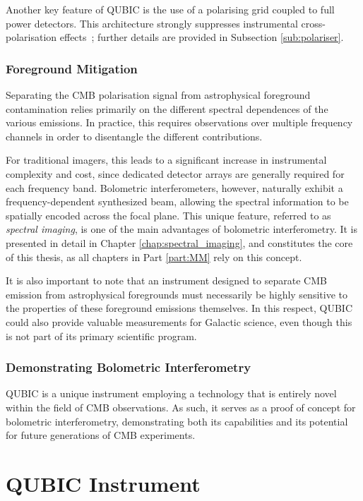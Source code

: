 \documentclass[../../thesis.tex]{subfiles}
\begin{document}
Another key feature of QUBIC is the use of a polarising grid coupled to full power detectors. This architecture strongly suppresses instrumental cross-polarisation effects~\cite{QUBICVI}; further details are provided in Subsection \ref{sub:polariser}.

\subsubsection{Foreground Mitigation}

Separating the CMB polarisation signal from astrophysical foreground contamination relies primarily on the different spectral dependences of the various emissions. In practice, this requires observations over multiple frequency channels in order to disentangle the different contributions.

For traditional imagers, this leads to a significant increase in instrumental complexity and cost, since dedicated detector arrays are generally required for each frequency band. Bolometric interferometers, however, naturally exhibit a frequency-dependent synthesized beam, allowing the spectral information to be spatially encoded across the focal plane. This unique feature, referred to as \emph{spectral imaging}, is one of the main advantages of bolometric interferometry. It is presented in detail in Chapter \ref{chap:spectral_imaging}, and constitutes the core of this thesis, as all chapters in Part \ref{part:MM} rely on this concept.

It is also important to note that an instrument designed to separate CMB emission from astrophysical foregrounds must necessarily be highly sensitive to the properties of these foreground emissions themselves. In this respect, QUBIC could also provide valuable measurements for Galactic science, even though this is not part of its primary scientific program.

\subsubsection{Demonstrating Bolometric Interferometry}

QUBIC is a unique instrument employing a technology that is entirely novel within the field of CMB observations. As such, it serves as a proof of concept for bolometric interferometry, demonstrating both its capabilities and its potential for future generations of CMB experiments.

\section{QUBIC Instrument}
\end{document}
